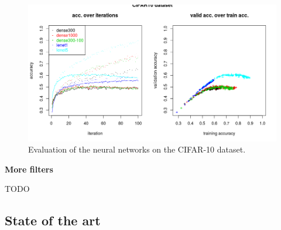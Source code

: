 \begin{figure}
 \includegraphics[width=\textwidth]{../plots/nn_cifar10}
 \caption{Evaluation of the neural networks on the CIFAR-10 dataset.}
 \label{cifar10_plots}
\end{figure}

\textbf{More filters}

TODO

\subsection{State of the art}